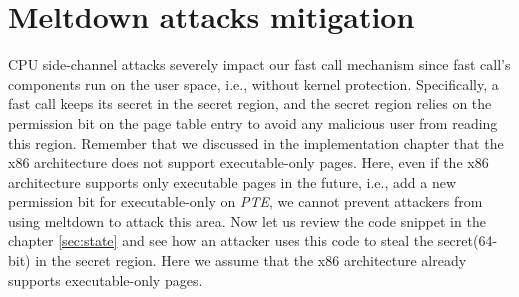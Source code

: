 \section{Meltdown attacks mitigation}

CPU side-channel attacks\cite{3,4} severely impact our fast call 
mechanism since fast call's components run on the user space, 
i.e., without kernel protection. Specifically, a fast call keeps its secret 
in the secret region, and the secret region relies on the permission bit on 
the page table entry to avoid any malicious user from reading this region. 
Remember that we discussed in the implementation chapter that the x86 architecture does not 
support executable-only pages.  Here, even if the x86 architecture supports 
only executable pages in the future, i.e., add a new permission bit for 
executable-only on \emph{PTE}\cite{25},  we cannot prevent attackers from using meltdown to 
attack this area. Now let us review the code snippet in the chapter \ref{sec:state} and see how an attacker uses this code to steal the secret(64-bit) in the 
secret region. Here we assume that the x86 architecture already supports 
executable-only pages.

